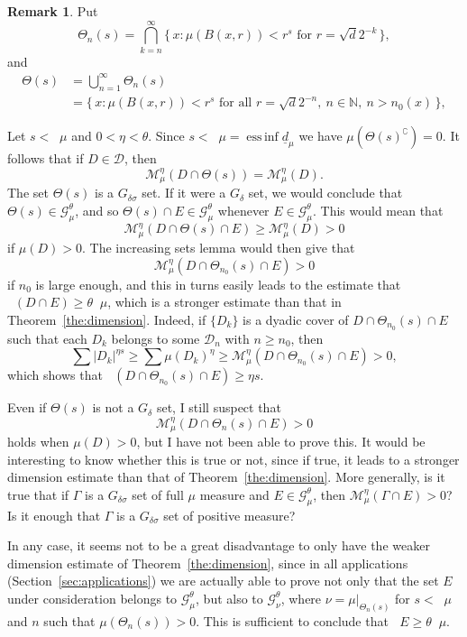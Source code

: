 \documentclass[10pt]{amsart}
\theoremstyle{definition}\newtheorem{defi}[theo]{Definition}\newtheorem{rema}[theo]{Remark}\newtheorem{exam}[theo]{Example}\newtheorem{exem}[theo]{Example}\newtheorem{nota}[theo]{Notation}
\DeclareMathOperator{\dimh}{dim_H}
\DeclareMathOperator{\ldimh}{\underline{dim}_H}
\DeclareMathOperator{\udimh}{\overline{dim}_H}
\DeclareMathOperator*{\essinf}{ess\,inf}
\begin{document}
\begin{rema}\label{rem:dimension}
Put
\[
\Theta_n (s) = \bigcap_{k=n}^\infty \{\, x : \mu (B (x,r)) < r^s
\text{ for } r = \sqrt{d} 2^{-k} \,\},
\]
and
\begin{align*}
\Theta (s) &= \bigcup_{n=1}^\infty \Theta_n (s)
\\ &= \{\, x : \mu (B (x,r)) < r^s \text{ for all } r = \sqrt{d} 2^{-n},\ n \in \mathbb{N},\ n> n_0 (x) \,\},
\end{align*}

Let $s < \ldimh \mu$ and $0 < \eta < \theta$. Since $s < \ldimh \mu = \essinf \underline{d}_\mu$ we have $\mu (\Theta(s)^\complement) = 0$. It follows that if $D \in \mathscr{D}$, then
\[
\mathscr{M}_\mu^\eta (D \cap \Theta (s)) =
\mathscr{M}_\mu^\eta (D).
\]
The set $\Theta (s)$ is a $G_{\delta \sigma}$ set. If it were a $G_\delta$ set, we would conclude that $\Theta (s) \in
\mathscr{G}_\mu^\theta$, and so $\Theta (s) \cap E \in
\mathscr{G}_\mu^\theta$ whenever $E \in
\mathscr{G}_\mu^\theta$. This would mean that
\[
\mathscr{M}_\mu^\eta (D \cap \Theta (s) \cap E) \geq
\mathscr{M}_\mu^\eta (D) > 0
\]
if $\mu (D) > 0$. The increasing sets lemma would then give that
\[
\mathscr{M}_\mu^\eta (D \cap \Theta_{n_0} (s) \cap E) > 0
\]
if $n_0$ is large enough, and this in turns easily leads to the estimate that $\dimh (D \cap E) \geq \theta \ldimh \mu$, which is a stronger estimate than that in Theorem~\ref{the:dimension}. Indeed, if $\{D_k\}$ is a dyadic cover of $D \cap \Theta_{n_0} (s) \cap E$ such that each $D_k$ belongs to some $\mathscr{D}_n$ with $n \geq n_0$, then
\[
\sum |D_k|^{\eta s} \geq \sum \mu (D_k)^\eta \geq
\mathscr{M}_\mu^\eta (D \cap \Theta_{n_0} (s) \cap E) > 0,
\]
which shows that $\dimh (D \cap \Theta_{n_0} (s) \cap E) \geq \eta s$.

Even if $\Theta (s)$ is not a $G_\delta$ set, I still suspect that
\[
\mathscr{M}_\mu^\eta (D \cap \Theta_n (s) \cap E) > 0
\]
holds when $\mu (D) > 0$, but I have not been able to prove this. It would be interesting to know whether this is true or not, since if true, it leads to a stronger dimension estimate than that of Theorem~\ref{the:dimension}. More generally, is it true that if $\Gamma$ is a $G_{\delta \sigma}$ set of full $\mu$ measure and $E
\in \mathscr{G}_\mu^\theta$, then $\mathscr{M}_\mu^\eta (\Gamma \cap E) > 0$? Is it enough that $\Gamma$ is a $G_{\delta \sigma}$ set of positive measure?

In any case, it seems not to be a great disadvantage to only have the weaker dimension estimate of Theorem~\ref{the:dimension}, since in all applications (Section~\ref{sec:applications}) we are actually able to prove not only that the set $E$ under consideration belongs to $\mathscr{G}_\mu^\theta$, but also to $\mathscr{G}_\nu^\theta$, where $\nu = \mu |_{\Theta_n (s)}$ for $s < \udimh \mu$ and $n$ such that $\mu (\Theta_n (s)) > 0$. This is sufficient to conclude that $\dimh E \geq \theta \udimh \mu$.
\end{rema}
\end{document}
